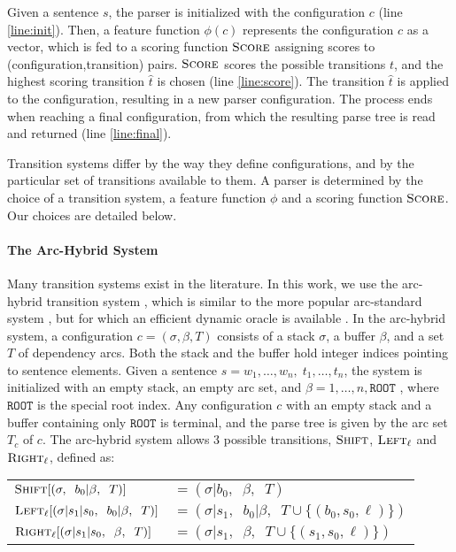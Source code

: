 \documentclass[11pt]{article}
\begin{document}
Given a sentence $s$, the parser is initialized with the configuration $c$ (line
\ref{line:init}).
Then, a feature function $\phi(c)$ represents the configuration $c$ as
a vector, which is fed to a scoring function $\textsc{Score}$ assigning
scores to (configuration,transition) pairs. $\textsc{Score}$ scores the
possible transitions $t$, and the highest scoring transition $\hat{t}$ is chosen (line
\ref{line:score}).  The transition $\hat{t}$ is applied to the configuration,
resulting in a new parser configuration.  The process ends when reaching a final
configuration, from which the resulting parse tree is read and returned (line
\ref{line:final}).

Transition systems differ by the way they define configurations, and by the
particular set of transitions available to them.
A parser is determined by the choice of a transition system, a feature function $\phi$ and a scoring
function $\textsc{Score}$.  Our choices are detailed below.

\paragraph{The Arc-Hybrid System}
Many transition systems exist in the literature. In this work, we use the
arc-hybrid transition system \cite{kuhlmann2011}, which is similar to the more
popular arc-standard system \cite{arc-eager}, but for which an efficient
dynamic oracle is available \cite{coling2012dynamic,tacl2013dynamic}.
In the arc-hybrid system, a configuration $c = (\sigma, \beta, T)$ consists of a
stack $\sigma$, a buffer $\beta$, and a set $T$ of dependency arcs. 
Both the stack and the buffer hold integer indices pointing to sentence elements.
Given a sentence $s = w_1, \dots , w_n,\;t_1,\dots,t_n$, the system
is initialized with an empty stack, an empty arc set, and $\beta = 1, \dots ,
n,\mathtt{ROOT}$ , where $\mathtt{ROOT}$ is
the special root index. Any configuration $c$ with an empty stack and a buffer
containing only $\mathtt{ROOT}$ is
terminal, and the parse tree is given by the arc set $T_c$ of $c$.
The arc-hybrid system allows 3 possible transitions,
$\textsc{Shift}$, $\textsc{Left}_{\ell}$ and $\textsc{Right}_{\ell}$, defined
as:
\vspace{-5pt}
\begin{center}
\begin{scalebox}{0.8}{
\begin{tabular}{ll}
    $\textsc{Shift}[(\sigma,\;\; b_0 | \beta,\;\; T)]$ &$= (\sigma | b_0,\;\; \beta,\;\; T)$ \\
    $\textsc{Left}_{\ell}[(\sigma | s_1 | s_0 ,\;\; b_0 | \beta,\;\; T)]$ &$= (\sigma | s_1,\;\; b_0 | \beta,\;\; T \cup \{(b_0, s_0, \ell)\})$ \\
    $\textsc{Right}_{\ell}[(\sigma | s_1 | s_0 ,\;\; \beta,\;\; T)]$ &$= (\sigma | s_1,\;\; \beta,\;\; T \cup \{(s_1, s_0, \ell)\})$ \\
\end{tabular}}\end{scalebox}
\end{center}
\vspace{5pt}
\end{document}
